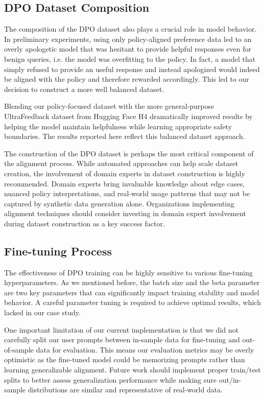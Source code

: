 \subsection{DPO Dataset Composition}

The composition of the DPO dataset also plays a crucial role in model behavior. In preliminary experiments, using only policy-aligned preference data led to an overly apologetic model that was hesitant to provide helpful responses even for benign queries, i.e. the model was overfitting to the policy. In fact, a model that simply refused to provide an useful response and instead apologized would indeed be aligned with the policy and therefore rewarded accordingly. This led to our decision to construct a more well balanced dataset.

Blending our policy-focused dataset with the more general-purpose UltraFeedback dataset from Hugging Face H4  dramatically improved results by helping the model maintain helpfulness while learning appropriate safety boundaries. The results reported here reflect this balanced dataset approach. 

The construction of the DPO dataset is perhaps the most critical component of the alignment process. While automated approaches can help scale dataset creation, the involvement of domain experts in dataset construction is highly recommended. Domain experts bring invaluable knowledge about edge cases, nuanced policy interpretations, and real-world usage patterns that may not be captured by synthetic data generation alone. Organizations implementing alignment techniques should consider investing in domain expert involvement during dataset construction as a key success factor.

\subsection{Fine-tuning Process}
 
The effectiveness of DPO training can be highly sensitive to various fine-tuning hyperparameters. As we mentioned before, the batch size and the beta parameter are two key parameters that can significantly impact training stability and model behavior. A careful parameter tuning is required to achieve optimal results, which lacked in our case study.

One important limitation of our current implementation is that we did not carefully split our user prompts between in-sample data for fine-tuning and out-of-sample data for evaluation. This means our evaluation metrics may be overly optimistic as the fine-tuned model could be memorizing prompts rather than learning generalizable alignment. Future work should implement proper train/test splits to better assess generalization performance while making sure out/in-sample distributions are similar and representative of real-world data.

